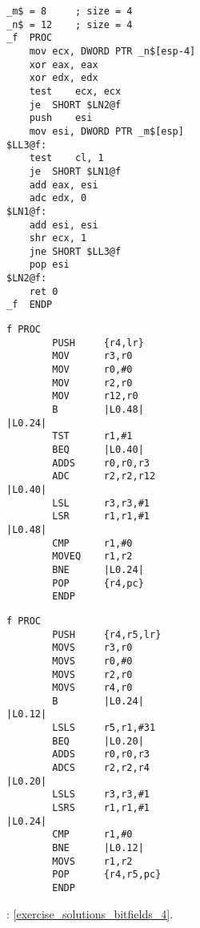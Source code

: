 \begin{lstlisting}[caption=\Optimizing MSVC 2010]
_m$ = 8		; size = 4
_n$ = 12	; size = 4
_f	PROC
	mov	ecx, DWORD PTR _n$[esp-4]
	xor	eax, eax
	xor	edx, edx
	test	ecx, ecx
	je	SHORT $LN2@f
	push	esi
	mov	esi, DWORD PTR _m$[esp]
$LL3@f:
	test	cl, 1
	je	SHORT $LN1@f
	add	eax, esi
	adc	edx, 0
$LN1@f:
	add	esi, esi
	shr	ecx, 1
	jne	SHORT $LL3@f
	pop	esi
$LN2@f:
	ret	0
_f	ENDP
\end{lstlisting}

\begin{lstlisting}[caption=\OptimizingKeilVI (\ARMMode)]
f PROC
        PUSH     {r4,lr}
        MOV      r3,r0
        MOV      r0,#0
        MOV      r2,r0
        MOV      r12,r0
        B        |L0.48|
|L0.24|
        TST      r1,#1
        BEQ      |L0.40|
        ADDS     r0,r0,r3
        ADC      r2,r2,r12
|L0.40|
        LSL      r3,r3,#1
        LSR      r1,r1,#1
|L0.48|
        CMP      r1,#0
        MOVEQ    r1,r2
        BNE      |L0.24|
        POP      {r4,pc}
        ENDP
\end{lstlisting}

\begin{lstlisting}[caption=\OptimizingKeilVI (\ThumbMode)]
f PROC
        PUSH     {r4,r5,lr}
        MOVS     r3,r0
        MOVS     r0,#0
        MOVS     r2,r0
        MOVS     r4,r0
        B        |L0.24|
|L0.12|
        LSLS     r5,r1,#31
        BEQ      |L0.20|
        ADDS     r0,r0,r3
        ADCS     r2,r2,r4
|L0.20|
        LSLS     r3,r3,#1
        LSRS     r1,r1,#1
|L0.24|
        CMP      r1,#0
        BNE      |L0.12|
        MOVS     r1,r2
        POP      {r4,r5,pc}
        ENDP
\end{lstlisting}

\Answer{}: \ref{exercise_solutions_bitfields_4}.
